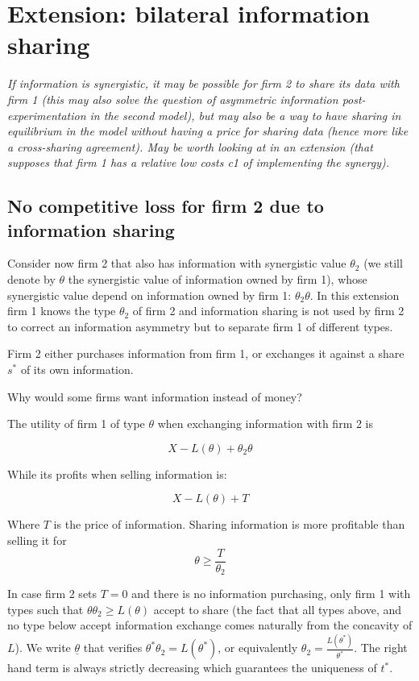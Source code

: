 \documentclass[a4paper]{article}
\renewcommand{\t}{\theta}
\begin{document}
  
\section{Extension: bilateral information sharing}

\textit{If information is synergistic, it may be possible for firm 2 to share its data with firm 1 (this may also solve the question of asymmetric information post-experimentation in the second model), but may also be a way to have sharing in equilibrium in the model without having a price for sharing data (hence more like a cross-sharing agreement). May be worth looking at in an extension (that supposes that firm 1 has a relative low costs c1 of implementing the synergy).}


\subsection{No competitive loss for firm 2 due to information sharing}


Consider now firm 2 that also has information with synergistic value $\t_2$ (we still denote by $\t$ the synergistic value of information owned by firm 1), whose synergistic value depend on information owned by firm 1: $\t_2 \t$. In this extension firm 1 knows the type $\t_2$ of firm 2 and information sharing is not used by firm 2 to correct an information asymmetry but to separate firm 1 of different types.  

Firm 2 either purchases information from firm 1, or exchanges it against a share $s^*$ of its own information. 

Why would some firms want information instead of money?

The utility of firm 1 of type $\t$ when exchanging information with firm 2 is

\[
X-L(\t)+\t_2 \t
\]

While its profits when selling information is:

\[
X-L(\t)+T
\]

Where $T$ is the price of information. Sharing information is more profitable than selling it for $$\t\geq \frac{T}{\t_2}$$


In case firm 2 sets $T=0$ and there is no information purchasing, only firm 1 with types such that $\t \t_2\geq L(\t)$ accept to share (the fact that all types above, and no type below accept information exchange comes naturally from the concavity of $L$). We write $\underline \t$ that verifies $\t^* \t_2= L(\t^*)$, or equivalently $\t_2= \frac{L(\t^*)}{\t^*}$. The right hand term is always strictly decreasing which guarantees the uniqueness of $t^*$.
\end{document}
